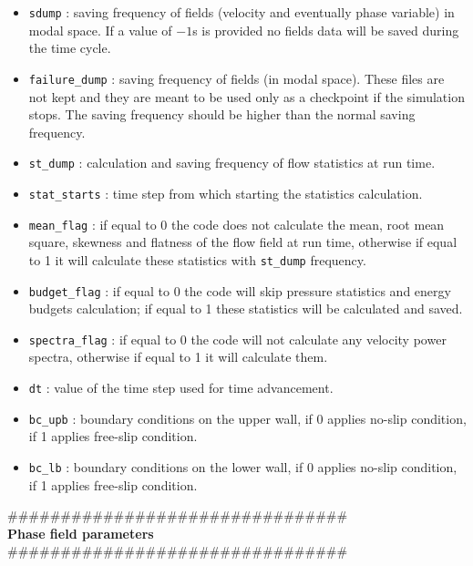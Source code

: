\begin{itemize}[label={$\circ$}]
\item \texttt{sdump} : saving frequency of fields (velocity and eventually phase variable) in modal space. If a value of $-1$s is provided no fields data will be saved during the time cycle.
\item \texttt{failure\_dump} : saving frequency of fields (in modal space). These files are not kept and they are meant to be used only as a checkpoint if the simulation stops. The saving frequency should be higher than the normal saving frequency.
\item \texttt{st\_dump} : calculation and saving frequency of flow statistics at run time.
\item \texttt{stat\_starts} : time step from which starting the statistics calculation.
\item \texttt{mean\_flag} : if equal to 0 the code does not calculate the mean, root mean square, skewness and flatness of the flow field at run time, otherwise if equal to 1 it will calculate these statistics with \texttt{st\_dump} frequency.
\item \texttt{budget\_flag} : if equal to 0 the code will skip pressure statistics and energy budgets calculation; if equal to 1 these statistics will be calculated and saved.
\item \texttt{spectra\_flag} : if equal to 0 the code will not calculate any velocity power spectra, otherwise if equal to 1 it will calculate them.
\item \texttt{dt} : value of the time step used for time advancement.
\item \texttt{bc\_upb} : boundary conditions on the upper wall, if 0 applies no-slip condition, if 1 applies free-slip condition.
\item \texttt{bc\_lb} : boundary conditions on the lower wall, if 0 applies no-slip condition, if 1 applies free-slip condition.
\end{itemize}
\#\#\#\#\#\#\#\#\#\#\#\#\#\#\#\#\#\#\#\#\#\#\#\#\#\#\#\#\#\#\#\#\\
{\bf Phase field parameters}\\
\#\#\#\#\#\#\#\#\#\#\#\#\#\#\#\#\#\#\#\#\#\#\#\#\#\#\#\#\#\#\#\#
